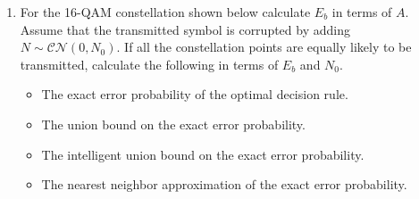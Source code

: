 \documentclass[10pt]{report}
\begin{document}
\begin{enumerate}
  \item For the 16-QAM constellation shown below calculate $E_b$ in terms of $A$. Assume that the transmitted symbol is corrupted by adding $N\sim \mathcal{CN}(0,N_0)$. If all the constellation points are equally likely to be transmitted, calculate the following in terms of $E_b$ and $N_0$.
  \begin{itemize}
    \item The exact error probability of the optimal decision rule.
    \item The union bound on the exact error probability.
    \item The intelligent union bound on the exact error probability.
    \item The nearest neighbor approximation of the exact error probability.
  \end{itemize}
  \begin{figure}[h]
    \centering
  \end{figure}

\end{enumerate}
\end{document}
